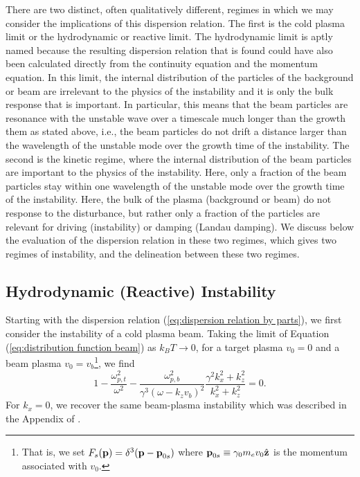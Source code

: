 \documentclass[usenatbib,iop,apj]{emulateapj}
\newcommand\bmath[1] {\mbox{\boldmath$\rm #1$}}
\begin{document}
There are two distinct, often qualitatively different, regimes in which we may consider the implications of this dispersion relation.  The first is the cold plasma limit or the hydrodynamic or reactive limit.  The hydrodynamic limit is aptly named because the resulting dispersion relation that is found could have also been calculated directly from the continuity equation and the momentum equation.  In this limit, the internal distribution of the particles of the background or beam are irrelevant to the physics of the instability and it is only the bulk response that is important.  In particular, this means that the beam particles are resonance with the unstable wave over a timescale much longer than the growth them as stated above, i.e., the beam particles do not drift a distance larger than the wavelength of the unstable mode over the growth time of the instability.  The second is the kinetic regime, where the internal distribution of the beam particles are important to the physics of the instability. Here, only a fraction of the beam particles stay within one wavelength of the unstable mode over the growth time of the instability.   Here, the bulk of the plasma (background or beam) do not response to the disturbance, but rather only a fraction of the particles are relevant for driving (instability) or damping (Landau damping).  We discuss below the evaluation of the dispersion relation in these two regimes, which gives two regimes of instability, and the delineation between these two regimes.

\subsection{Hydrodynamic (Reactive) Instability}

Starting with the dispersion relation (\ref{eq:dispersion relation by parts}), we first consider the instability of a cold plasma beam. 
Taking the limit of Equation (\ref{eq:distribution function beam}) as $k_BT  \rightarrow 0$, for a target plasma $v_0=0$ and a beam plasma $v_0=v_b$\footnote{That is, we set $F_s(\bmath{p})=\delta^3(\bmath{p}-\bmath{p}_{0s})$ where $\bmath{p}_{0s}\equiv \gamma_0 m_e v_0 \hat{\bmath{z}}$ is the momentum associated with $v_0$.}, we find
\begin{equation}\label{eq:dispersion relation reactive}
 1 - \frac{\omega_{p,t}^2}{\omega^2} - \frac{\omega_{p,b}^2}{\gamma^3(\omega-k_z v_b)^2}\frac{\gamma^2 k_x^2 + k_z^2}{k_x^2 + k_z^2} = 0.
\end{equation}
For $k_x = 0$, we recover the same beam-plasma instability which was described in the Appendix of \citet{BCP}.  
\end{document}
